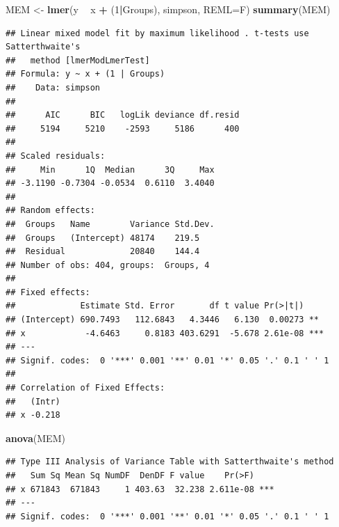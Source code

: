 \documentclass[]{book}
\newenvironment{Shaded}{\begin{snugshade}}{\end{snugshade}}
\newcommand{\DataTypeTok}[1]{\textcolor[rgb]{0.13,0.29,0.53}{#1}}
\newcommand{\DecValTok}[1]{\textcolor[rgb]{0.00,0.00,0.81}{#1}}
\newcommand{\KeywordTok}[1]{\textcolor[rgb]{0.13,0.29,0.53}{\textbf{#1}}}
\newcommand{\NormalTok}[1]{#1}
\newcommand{\OperatorTok}[1]{\textcolor[rgb]{0.81,0.36,0.00}{\textbf{#1}}}
\newcommand{\StringTok}[1]{\textcolor[rgb]{0.31,0.60,0.02}{#1}}
\begin{document}
\begin{Shaded}
\begin{Highlighting}[]
\NormalTok{MEM <-}\StringTok{ }\KeywordTok{lmer}\NormalTok{(y }\OperatorTok{~}\StringTok{ }\NormalTok{x }\OperatorTok{+}\StringTok{ }\NormalTok{(}\DecValTok{1}\OperatorTok{|}\NormalTok{Groups), simpson, }\DataTypeTok{REML=}\NormalTok{F)}
\KeywordTok{summary}\NormalTok{(MEM)}
\end{Highlighting}
\end{Shaded}

\begin{verbatim}
## Linear mixed model fit by maximum likelihood . t-tests use Satterthwaite's
##   method [lmerModLmerTest]
## Formula: y ~ x + (1 | Groups)
##    Data: simpson
## 
##      AIC      BIC   logLik deviance df.resid 
##     5194     5210    -2593     5186      400 
## 
## Scaled residuals: 
##     Min      1Q  Median      3Q     Max 
## -3.1190 -0.7304 -0.0534  0.6110  3.4040 
## 
## Random effects:
##  Groups   Name        Variance Std.Dev.
##  Groups   (Intercept) 48174    219.5   
##  Residual             20840    144.4   
## Number of obs: 404, groups:  Groups, 4
## 
## Fixed effects:
##             Estimate Std. Error       df t value Pr(>|t|)    
## (Intercept) 690.7493   112.6843   4.3446   6.130  0.00273 ** 
## x            -4.6463     0.8183 403.6291  -5.678 2.61e-08 ***
## ---
## Signif. codes:  0 '***' 0.001 '**' 0.01 '*' 0.05 '.' 0.1 ' ' 1
## 
## Correlation of Fixed Effects:
##   (Intr)
## x -0.218
\end{verbatim}

\begin{Shaded}
\begin{Highlighting}[]
\KeywordTok{anova}\NormalTok{(MEM)}
\end{Highlighting}
\end{Shaded}

\begin{verbatim}
## Type III Analysis of Variance Table with Satterthwaite's method
##   Sum Sq Mean Sq NumDF  DenDF F value    Pr(>F)    
## x 671843  671843     1 403.63  32.238 2.611e-08 ***
## ---
## Signif. codes:  0 '***' 0.001 '**' 0.01 '*' 0.05 '.' 0.1 ' ' 1
\end{verbatim}
\end{document}
